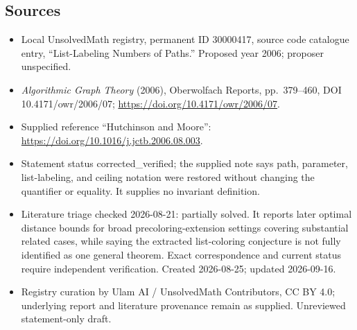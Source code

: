 \documentclass[11pt]{article}
\begin{document}
\subsection{Sources}
\begin{itemize}
\item Local UnsolvedMath registry, permanent ID 30000417, source code catalogue entry, ``List-Labeling Numbers of Paths.'' Proposed year 2006; proposer unspecified.
\item \emph{Algorithmic Graph Theory} (2006), Oberwolfach Reports, pp.\ 379--460, DOI 10.4171/owr/2006/07; \url{https://doi.org/10.4171/owr/2006/07}.
\item Supplied reference ``Hutchinson and Moore'': \url{https://doi.org/10.1016/j.jctb.2006.08.003}.
\item Statement status corrected\_verified; the supplied note says path, parameter, list-labeling, and ceiling notation were restored without changing the quantifier or equality. It supplies no invariant definition.
\item Literature triage checked 2026-08-21: partially solved. It reports later optimal distance bounds for broad precoloring-extension settings covering substantial related cases, while saying the extracted list-coloring conjecture is not fully identified as one general theorem. Exact correspondence and current status require independent verification. Created 2026-08-25; updated 2026-09-16.
\item Registry curation by Ulam AI / UnsolvedMath Contributors, CC BY 4.0; underlying report and literature provenance remain as supplied. Unreviewed statement-only draft.
\end{itemize}
\end{document}
